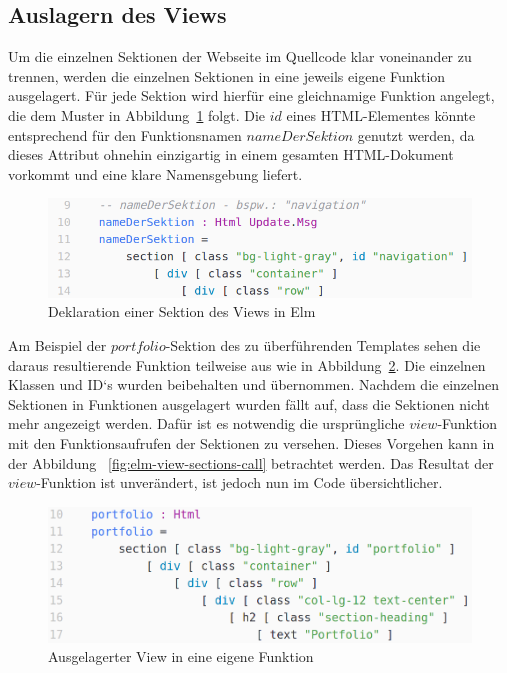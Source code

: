 \subsection{Auslagern des Views}
\label{sec:auslagern-des-views}
Um die einzelnen Sektionen der Webseite im Quellcode klar voneinander zu trennen, werden die einzelnen Sektionen in eine jeweils eigene Funktion ausgelagert.
Für jede Sektion wird hierfür eine gleichnamige Funktion angelegt, die dem Muster in Abbildung~\ref{fig:elm-view-section} folgt. Die $id$ eines \ac{HTML}-Elementes könnte entsprechend für den Funktionsnamen $nameDerSektion$ genutzt werden, da dieses Attribut ohnehin einzigartig in einem gesamten \ac{HTML}-Dokument vorkommt und eine klare Namensgebung liefert.
\begin{figure}[htb]
\centering
\includegraphics[scale=0.53]{img/elm-html-sections.png}
\caption{Deklaration einer Sektion des Views in Elm}\label{fig:elm-view-section}
\end{figure}
Am Beispiel der $portfolio$-Sektion des zu überführenden Templates sehen die daraus resultierende Funktion teilweise aus wie in Abbildung~\ref{fig:elm-view-section-function}. Die einzelnen Klassen und ID`s wurden beibehalten und übernommen. Nachdem die einzelnen Sektionen in Funktionen ausgelagert wurden fällt auf, dass die Sektionen nicht mehr angezeigt werden. Dafür ist es notwendig die ursprüngliche $view$-Funktion mit den Funktionsaufrufen der Sektionen zu versehen. Dieses Vorgehen kann in der Abbildung ~\ref{fig:elm-view-sections-call} betrachtet werden. Das Resultat der $view$-Funktion ist unverändert, ist jedoch nun im Code übersichtlicher.
\begin{figure}[h]
\centering
\includegraphics[scale=0.41]{img/elm-view-portfolio-section-function.png}
\caption{Ausgelagerter View in eine eigene Funktion}\label{fig:elm-view-section-function}
\end{figure}

